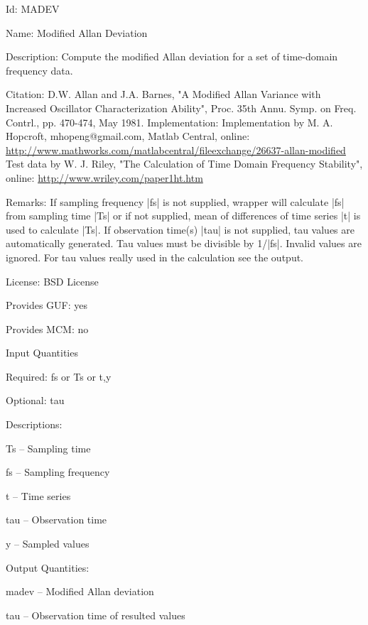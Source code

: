 \begin{tightdesc}
\item [Id:] MADEV
\item [Name:] Modified Allan Deviation
\item [Description:] Compute the modified Allan deviation for a set of time-domain frequency data.
\item [Citation:] D.W. Allan and J.A. Barnes, "A Modified Allan Variance with Increased Oscillator Characterization Ability", Proc. 35th Annu. Symp. on Freq. Contrl., pp. 470-474, May 1981. Implementation: Implementation by M. A. Hopcroft, mhopeng@gmail.com, Matlab Central, online: \url{http://www.mathworks.com/matlabcentral/fileexchange/26637-allan-modified} Test data by W. J. Riley, "The Calculation of Time Domain Frequency Stability", online: \url{http://www.wriley.com/paper1ht.htm}
\item [Remarks:] If sampling frequency |fs| is not supplied, wrapper will calculate |fs| from sampling time |Ts| or if not supplied, mean of differences of time series |t| is used to calculate |Ts|. If observation time(s) |tau| is not supplied, tau values are automatically generated. Tau values must be divisible by 1/|fs|. Invalid values are ignored. For tau values really used in the calculation see the output.
\item [License:] BSD License
\item [Provides GUF:] yes
\item [Provides MCM:] no
\item [Input Quantities] \rule{0em}{0em}
    \begin{tightdesc}
    \item [Required:] 
        \textsf{fs} or \textsf{Ts} or \textsf{t},\enspace \textsf{y}
    \item [Optional:] 
        \textsf{tau}
    \item [Descriptions:] \rule{0em}{0em}
        \begin{tightdesc}
            \item[\textsf{Ts}] -- Sampling time
            \item[\textsf{fs}] -- Sampling frequency
            \item[\textsf{t}] -- Time series
            \item[\textsf{tau}] -- Observation time
            \item[\textsf{y}] -- Sampled values
        \end{tightdesc}
    \end{tightdesc}
\item [Output Quantities:] \rule{0em}{0em}
    \begin{tightdesc}
        \item[\textsf{madev}] -- Modified Allan deviation
        \item[\textsf{tau}] -- Observation time of resulted values
    \end{tightdesc}
\end{tightdesc}
